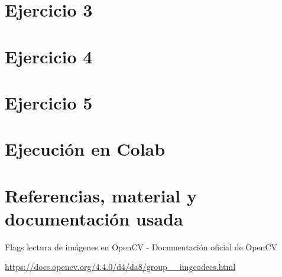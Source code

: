\documentclass[12pt, spanish]{article}
\begin{document}
\section{Ejercicio 3}

\section{Ejercicio 4}

\section{Ejercicio 5}

\section{Ejecución en Colab}

\newpage

\section{Referencias, material y documentación usada}


\begin{thebibliography}{9}

Flags lectura de imágenes en OpenCV - Documentación oficial de OpenCV

\url{https://docs.opencv.org/4.4.0/d4/da8/group__imgcodecs.html}


\end{thebibliography}
\end{document}

